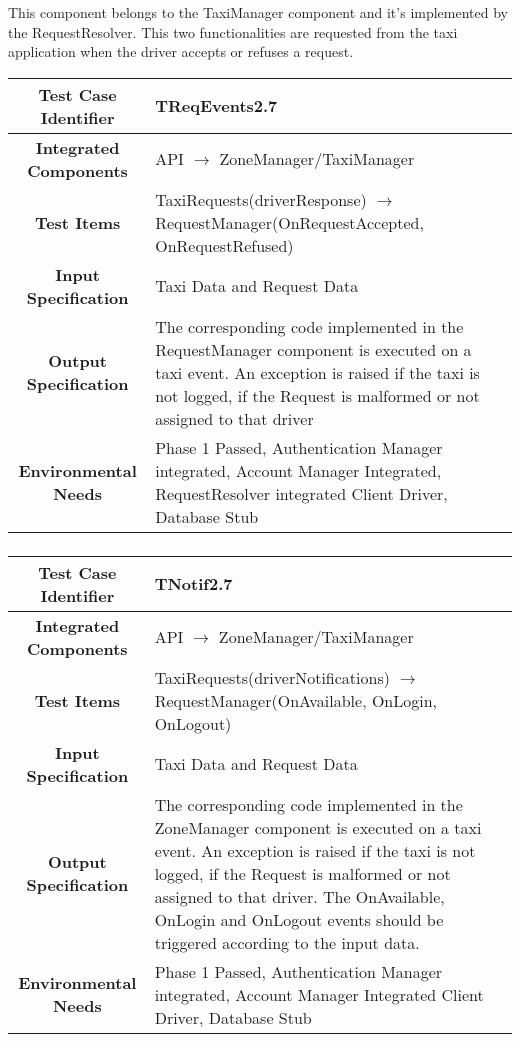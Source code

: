 \documentclass[11pt, a4paper,titlepage]{article}
\begin{document}
	 	\subsubsection{}
	 	This component belongs to the TaxiManager component and it's implemented by the RequestResolver. This two functionalities are requested from the taxi application when the driver accepts or refuses a request.
	 \begin{tabularx}{\textwidth}{| c|X|}
	 	\hline \textbf{Test Case Identifier} & \label{TReqEvents2.7}TReqEvents2.7\\
	 	\hline \textbf{Integrated Components} & API  $\rightarrow $  ZoneManager/TaxiManager \\
	 	\hline \textbf{Test Items} & TaxiRequests(driverResponse) $\rightarrow $ RequestManager(OnRequestAccepted, OnRequestRefused) \\
	 	\hline \textbf{Input Specification} & Taxi Data and Request Data \\
	 	\hline \textbf{Output Specification} & The corresponding code implemented in the RequestManager component is executed on a taxi event. \newline An exception is raised if the taxi is not logged, if the Request is malformed or not assigned to that driver \\
	 	\hline \textbf{Environmental Needs} &  Phase 1 Passed, Authentication Manager integrated, Account Manager Integrated, RequestResolver integrated \newline 
	 	Client Driver, Database Stub\\
	 	\hline
	 \end{tabularx}
	 \newline	
	\subsubsection{}
	 \begin{tabularx}{\textwidth}{| c|X|}
			 	\hline \textbf{Test Case Identifier} & \label{TNotif2.7}TNotif2.7\\
			 	\hline \textbf{Integrated Components} & API  $\rightarrow $  ZoneManager/TaxiManager \\
			 	\hline \textbf{Test Items} & TaxiRequests(driverNotifications) $\rightarrow $ RequestManager(OnAvailable, OnLogin, OnLogout) \\
			 	\hline \textbf{Input Specification} & Taxi Data and Request Data \\
			 	\hline \textbf{Output Specification} & The corresponding code implemented in the ZoneManager component is executed on a taxi event. \newline An exception is raised if the taxi is not logged, if the Request is malformed or not assigned to that driver. \newline
			 	The OnAvailable, OnLogin and OnLogout events should be triggered according to the input data. \\
			 	\hline \textbf{Environmental Needs} &  Phase 1 Passed, Authentication Manager integrated, Account Manager Integrated \newline 
			 	Client Driver, Database Stub\\
			 	\hline
	 \end{tabularx}
	 \newline
\end{document}
